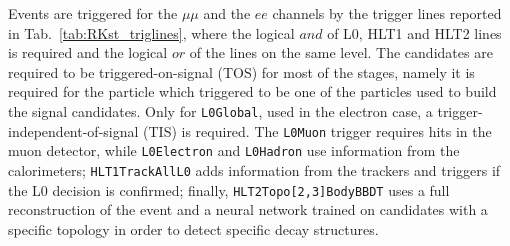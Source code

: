 Events are triggered for the $\mu\mu$ and the $ee$ channels by the trigger lines
reported in Tab.~\ref{tab:RKst_triglines}, where the logical $and$ of L0, HLT1 and HLT2
lines is required and the logical $or$ of the lines on the same level. The candidates are
required to be triggered-on-signal (TOS) for most of the stages, namely
it is required for the particle which triggered to be one of the particles used to build the signal candidates.
Only for \verb!L0Global!, used in the electron case, a trigger-independent-of-signal (TIS) is required. 
The \verb!L0Muon! trigger requires hits in the muon detector, while \verb!L0Electron! and \verb!L0Hadron! use information
from the calorimeters; \verb!HLT1TrackAllL0! adds information from the trackers and
triggers if the L0 decision is confirmed; finally, \verb!HLT2Topo[2,3]BodyBBDT! uses a full reconstruction 
of the event and a neural network trained on candidates with a specific topology in order to detect specific decay structures.

\begin{table}[h!]
\begin{center}
\caption{Summary of the trigger lines used to select the $\mu\mu$ and the $ee$ channels.
Where not explicitly indicated, the lines are required to be TOS.}
\label{tab:RKst_triglines}
\end{center}
\end{table}


